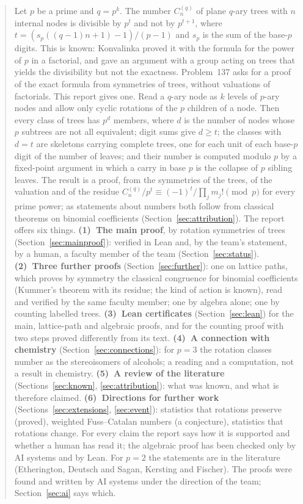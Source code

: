\documentclass[11pt]{article}
\theoremstyle{definition}
\theoremstyle{remark}
\numberwithin{equation}{section}
\numberwithin{figure}{section}
\begin{document}
\begin{abstract}
Let $p$ be a prime and $q=p^k$. The number $C_n^{(q)}$ of plane $q$-ary trees with $n$ internal nodes is
divisible by $p^t$ and not by $p^{t+1}$, where $t=(s_p((q-1)n+1)-1)/(p-1)$ and $s_p$ is the sum of the base-$p$
digits. This is known: Konvalinka proved it with the formula for the power of $p$ in a factorial, and gave an
argument with a group acting on trees that yields the divisibility but not the exactness. Problem~137 asks for
a proof of the exact formula from symmetries of trees, without valuations of factorials. This report gives
one. Read a $q$-ary node as $k$ levels of $p$-ary nodes and allow only cyclic rotations of the $p$ children of
a node. Then every class of trees has $p^d$ members, where $d$ is the number of nodes whose $p$ subtrees are
not all equivalent; digit sums give $d\ge t$; the classes with $d=t$ are skeletons carrying complete trees,
one for each unit of each base-$p$ digit of the number of leaves; and their number is computed modulo $p$ by a
fixed-point argument in which a carry in base $p$ is the collapse of $p$ sibling leaves. The result is a
proof, from the symmetries of the trees, of the valuation and of the residue
$C_n^{(q)}/p^t\equiv(-1)^t/\prod_jm_j!\pmod p$ for every prime power; as statements about numbers both follow
from classical theorems on binomial coefficients (Section~\ref{sec:attribution}). The report offers six
things. \textbf{(1)~The main proof}, by rotation symmetries of trees (Section~\ref{sec:mainproof}): verified in
Lean and, by the team's statement, by a human, a faculty member of the team (Section~\ref{sec:status}).
\textbf{(2)~Three further proofs} (Section~\ref{sec:further}): one on lattice paths, which proves by symmetry
the classical congruence for binomial coefficients (Kummer's theorem with its residue; the kind of action is
known), read and verified by the same faculty member; one by algebra alone; one by counting labelled trees.
\textbf{(3)~Lean certificates} (Section~\ref{sec:lean}) for the main, lattice-path and algebraic proofs, and
for the counting proof with two steps proved differently from its text. \textbf{(4)~A connection with
chemistry} (Section~\ref{sec:connections}): for $p=3$ the rotation classes number as the stereoisomers of
alcohols; a reading and a computation, not a result in chemistry. \textbf{(5)~A review of the literature}
(Sections~\ref{sec:known}, \ref{sec:attribution}): what was known, and what is therefore claimed.
\textbf{(6)~Directions for further work} (Sections~\ref{sec:extensions}, \ref{sec:event}): statistics that
rotations preserve (proved), weighted Fuss--Catalan numbers (a conjecture), statistics that rotations change.
For every claim the report says how it is supported and whether a human has read
it; the algebraic proof has been checked only by AI systems and by Lean. For $p=2$ the statements are in the literature (Etherington, Deutsch and Sagan, Kersting
and Fischer). The proofs were found and written by AI systems under the direction of the team; Section~\ref{sec:ai} says which.
\end{abstract}
\end{document}
